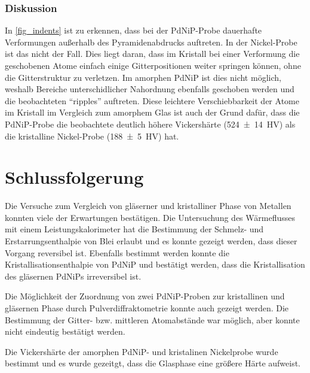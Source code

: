 \documentclass[
	a4paper,
	12pt,
	pagesize,
	ngerman
]{scrartcl}
\begin{document}
	\subsubsection{Diskussion}

	In \cref{fig_indents} ist zu erkennen, dass bei der PdNiP-Probe dauerhafte Verformungen außerhalb des Pyramidenabdrucks auftreten.
	In der Nickel-Probe ist das nicht der Fall.
	Dies liegt daran, dass im Kristall bei einer Verformung die geschobenen Atome einfach einige Gitterpositionen weiter springen können, ohne die Gitterstruktur zu verletzen. %
	Im amorphen PdNiP ist dies nicht möglich, weshalb Bereiche unterschidlicher Nahordnung ebenfalls geschoben werden und die beobachteten \enquote{ripples} auftreten. %
	Diese leichtere Verschiebbarkeit der Atome im Kristall im Vergleich zum amorphem Glas ist auch der Grund dafür, dass die PdNiP-Probe die beobachtete deutlich höhere Vickershärte (\SI{524 \pm 14}{HV}) als die kristalline Nickel-Probe (\SI{188 \pm 5}{HV}) hat.


	\section{Schlussfolgerung}
	Die Versuche zum Vergleich von gläserner und kristalliner Phase von Metallen konnten viele der Erwartungen bestätigen.
	Die Untersuchung des Wärmeflusses mit einem Leistungskalorimeter hat die Bestimmung der Schmelz- und Erstarrungsenthalpie von Blei erlaubt und es konnte gezeigt werden, dass dieser Vorgang reversibel ist.
	Ebenfalls bestimmt werden konnte die Kristallisationsenthalpie von PdNiP und bestätigt werden, dass die Kristallisation des gläsernen PdNiPs irreversibel ist.

	Die Möglichkeit der Zuordnung von zwei PdNiP-Proben zur kristallinen und gläsernen Phase durch Pulverdiffraktometrie konnte auch gezeigt werden.
	Die Bestimmung der Gitter- bzw. mittleren Atomabstände war möglich, aber konnte nicht eindeutig bestätigt werden.

	Die Vickershärte der amorphen PdNiP- und kristalinen Nickelprobe wurde bestimmt und es wurde gezeitgt, dass die Glasphase eine größere Härte aufweist.
\end{document}
